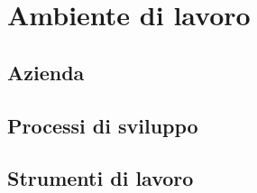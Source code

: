 \section{Ambiente di lavoro}
\subsection{Azienda}
\subsection{Processi di sviluppo}
\subsection{Strumenti di lavoro}